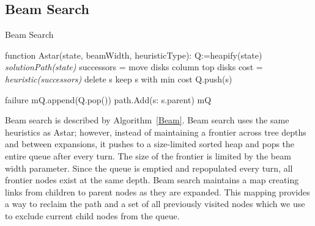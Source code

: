 \subsection{Beam Search}
\begin{algorithm}[!h]
\caption{Beam Search}
\label{Beam}
\begin{algorithmic}	
\STATE function Astar(state, beamWidth, heuristicType):
\STATE Q:=heapify(state)
	\RETURN \textit{solutionPath(state)}
\ENDIF
{}
	\STATE successors = move disks column top disks
	\STATE cost = \textit{heuristic(successors)}
\ENDIF 
{}
	\STATE delete s
	\STATE keep s with min cost
\ELSE
	\STATE Q.push(s) 
\ENDIF
\ENDFOR
	
	\RETURN failure
\ELSE
		\STATE mQ.append(Q.pop())
		\STATE path.Add(s: s.parent)
	\ENDFOR
	\RETURN mQ
\ENDIF
	\end{algorithmic}
\end{algorithm}

Beam search is described by Algorithm~\ref{Beam}.  
Beam search uses the same heuristics as Astar; however, instead of maintaining a frontier across tree depths and between expansions, it pushes to a size-limited sorted heap and pops the entire queue after every turn.
The size of the frontier is limited by the beam width parameter.
Since the queue is emptied and repopulated every turn, all frontier nodes exist at the same depth.
Beam search maintains a map creating links from children to parent nodes as they are expanded.  
This mapping provides a way to reclaim the path and a set of all previously visited nodes which we use to exclude current child nodes from the queue.